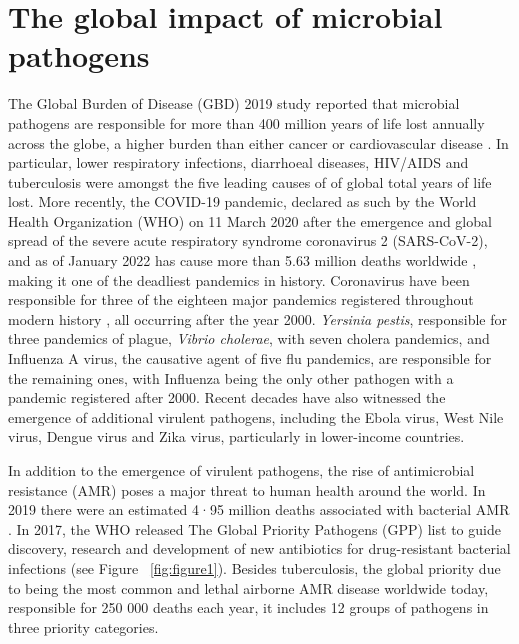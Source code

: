 \section{The global impact of microbial pathogens} \label{sec:global_impact}

The Global Burden of Disease (GBD) 2019 study reported that microbial pathogens are responsible for more than 400 million years of life lost annually across the globe, a higher burden than either cancer or cardiovascular disease \citep{vos_global_2020}. In particular, lower respiratory infections, diarrhoeal diseases, HIV/AIDS and tuberculosis were amongst the five leading causes of of global total years of life lost. More recently, the COVID-19 pandemic, declared as such by the World Health Organization (WHO) on 11 March 2020 after the emergence and global spread of the severe acute respiratory syndrome coronavirus 2 (SARS-CoV-2), and as of January 2022 has cause more than 5.63 million deaths worldwide \citep{ritchie_coronavirus_2020}, making it one of the deadliest pandemics in history. Coronavirus have been responsible for three of the eighteen major pandemics registered throughout modern history \citep{piret_pandemics_2021}, all occurring after the year 2000. \textit{Yersinia pestis}, responsible for three pandemics of plague, \textit{Vibrio cholerae}, with seven cholera pandemics, and Influenza A virus, the causative agent of five flu pandemics, are responsible for the remaining ones, with Influenza being the only other pathogen with a pandemic registered after 2000. Recent decades have also witnessed the emergence of additional virulent pathogens, including the Ebola virus, West Nile virus, Dengue virus and Zika virus, particularly in lower-income countries.

In addition to the emergence of virulent pathogens, the rise of antimicrobial resistance (AMR) poses a major threat to human health around the world. In 2019 there were an estimated 4·95 million deaths associated with bacterial AMR \citep{murray_global_2022}. In 2017, the WHO released The Global Priority Pathogens (GPP) list \citep{world_health_organization_prioritization_2017} to guide discovery, research and development of new antibiotics for drug-resistant bacterial infections (see Figure ~\ref{fig:figure1}). Besides tuberculosis, the global priority due to being the most common and lethal airborne AMR disease worldwide today, responsible for 250 000 deaths each year, it includes 12 groups of pathogens in three priority categories. 

